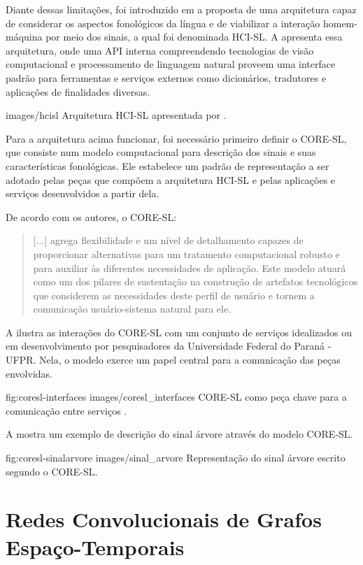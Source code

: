 Diante dessas limitações, foi introduzido em \cite{antunes-hcisl-2011} a proposta de uma arquitetura capaz de considerar os aspectos fonológicos da língua e de viabilizar a interação homem-máquina por meio dos sinais, a qual foi denominada HCI-SL. A  apresenta essa arquitetura, onde uma API interna compreendendo tecnologias de visão computacional e processamento de linguagem natural proveem uma interface padrão para ferramentas e serviços externos como dicionários, tradutores e aplicações de finalidades diversas.

    {images/hcisl}
    {Arquitetura HCI-SL apresentada por \cite{antunes-hcisl-2011}.}

Para a arquitetura acima funcionar, foi necessário primeiro definir o CORE-SL, que consiste num modelo computacional para descrição dos sinais e suas características fonológicas. Ele estabelece um padrão de representação a ser adotado pelas peças que compõem a arquitetura HCI-SL e pelas aplicações e serviços desenvolvidos a partir dela.

De acordo com os autores, o CORE-SL:

\begin{quote}
[...] agrega flexibilidade e um nível de detalhamento capazes de proporcionar alternativas para um tratamento computacional robusto e para auxiliar às diferentes necessidades de aplicação. Este modelo atuará como um dos pilares de sustentação na construção de artefatos tecnológicos que considerem as necessidades deste perfil de usuário e tornem a comunicação usuário-sistema natural para ele. \cite{antunes-2011}
\end{quote}

 A  ilustra as interações do CORE-SL com um conjunto de serviços idealizados ou em desenvolvimento por pesquisadores da Universidade Federal do Paraná - UFPR. Nela, o modelo exerce um papel central para a comunicação das peças envolvidas.

\image
    {fig:coresl-interfaces}
    {images/coresl_interfaces}
    {CORE-SL como peça chave para a comunicação entre serviços \cite{garcia-2013}.}

A  mostra um exemplo de descrição do sinal árvore através do modelo CORE-SL.

\image
    {fig:coresl-sinalarvore}
    {images/sinal_arvore}
    {Representação do sinal árvore escrito segundo o CORE-SL.}
    

\section{Redes Convolucionais de Grafos Espaço-Temporais} %

